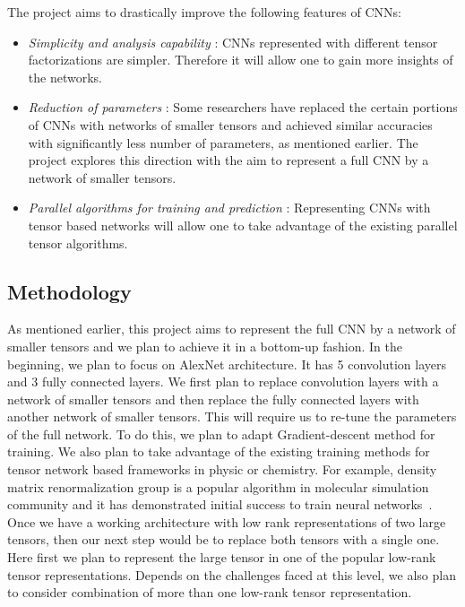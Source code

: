 The \prname project aims to drastically improve the following features of CNNs:
\begin{itemize}
	\item \emph{Simplicity and analysis capability} : CNNs represented with different tensor factorizations are simpler. Therefore it will allow one to gain more insights of the networks.
	\item \emph{Reduction of parameters} : Some researchers have replaced the certain portions of CNNs with  networks of smaller tensors and achieved  similar accuracies with significantly less number of parameters, as mentioned earlier. The \prname project explores this direction with the aim to represent a full CNN by a network of smaller tensors. 
	\item \emph{Parallel algorithms for training and prediction} : Representing CNNs with tensor based networks will allow one to take advantage of the existing parallel tensor algorithms.
\end{itemize}


\subsection*{Methodology} 

As mentioned earlier, this project aims to represent the full CNN by a network of smaller tensors and we plan to achieve it in a bottom-up fashion. In the beginning, we plan to focus on AlexNet architecture. It has 5 convolution layers and 3 fully connected layers. We first plan to replace convolution layers with a network of smaller tensors and then replace the fully connected layers with another network of smaller tensors. This will require us to re-tune the parameters of the full network. To do this, we plan to adapt Gradient-descent method for training. We also plan to take advantage of the existing training methods for tensor network based frameworks in physic or chemistry. For example, density matrix renormalization group is a popular algorithm in molecular simulation community and it has demonstrated initial success to train neural networks~\cite{SS-NIPS2016}. Once we have a working architecture with low rank representations of two large tensors, then our next step would be to replace both tensors with a single one. Here first we plan to represent the large tensor in one of the popular low-rank tensor representations. Depends on the challenges faced at this level, we also plan to consider combination of more than one low-rank tensor representation.    


